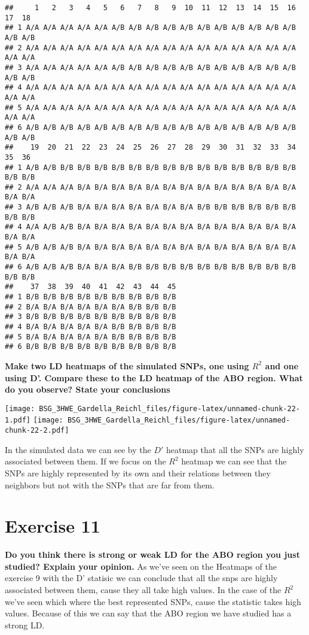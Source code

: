 \documentclass[]{article}
\begin{document}
\begin{verbatim}
##     1   2   3   4   5   6   7   8   9  10  11  12  13  14  15  16  17  18
## 1 A/A A/A A/A A/A A/A A/B A/B A/B A/B A/B A/B A/B A/B A/B A/B A/B A/B A/B
## 2 A/A A/A A/A A/A A/A A/A A/A A/A A/A A/A A/A A/A A/A A/A A/A A/A A/A A/A
## 3 A/A A/A A/A A/A A/A A/B A/B A/B A/B A/B A/B A/B A/B A/B A/B A/B A/B A/B
## 4 A/A A/A A/A A/A A/A A/A A/A A/A A/A A/A A/A A/A A/A A/A A/A A/A A/A A/A
## 5 A/A A/A A/A A/A A/A A/A A/A A/A A/A A/A A/A A/A A/A A/A A/A A/A A/A A/A
## 6 A/B A/B A/B A/B A/B A/B A/B A/B A/B A/B A/B A/B A/B A/B A/B A/B A/B A/B
##    19  20  21  22  23  24  25  26  27  28  29  30  31  32  33  34  35  36
## 1 A/B A/B B/B B/B B/B B/B B/B B/B B/B B/B B/B B/B B/B B/B B/B B/B B/B B/B
## 2 A/A A/A A/A B/A B/A B/A B/A B/A B/A B/A B/A B/A B/A B/A B/A B/A B/A B/A
## 3 A/B A/B A/B B/A B/A B/A B/A B/A B/A B/A B/B B/B B/B B/B B/B B/B B/B B/B
## 4 A/A A/B A/B B/A B/A B/A B/A B/A B/A B/A B/A B/A B/A B/A B/A B/A B/A B/A
## 5 A/B A/B A/B B/A B/A B/A B/A B/A B/A B/A B/A B/A B/A B/A B/A B/A B/A B/A
## 6 A/B A/B A/B B/A B/A B/A B/B B/B B/B B/B B/B B/B B/B B/B B/B B/B B/B B/B
##    37  38  39  40  41  42  43  44  45
## 1 B/B B/B B/B B/B B/B B/B B/B B/B B/B
## 2 B/A B/A B/A B/A B/A B/A B/B B/B B/B
## 3 B/B B/B B/B B/B B/B B/B B/B B/B B/B
## 4 B/A B/A B/A B/A B/A B/B B/B B/B B/B
## 5 B/A B/A B/A B/A B/A B/B B/B B/B B/B
## 6 B/B B/B B/B B/B B/B B/B B/B B/B B/B
\end{verbatim}

\textbf{Make two LD heatmaps of the simulated SNPs, one using \(R^2\)
and one using D'. Compare these to the LD heatmap of the ABO region.
What do you observe? State your conclusions}

\texttt{[image: BSG\_3HWE\_Gardella\_Reichl\_files/figure-latex/unnamed-chunk-22-1.pdf]}
\texttt{[image: BSG\_3HWE\_Gardella\_Reichl\_files/figure-latex/unnamed-chunk-22-2.pdf]}

In the simulated data we can see by the \(D'\) heatmap that all the SNPs
are highly associated between them. If we focus on the \(R^2\) heatmap
we can see that the SNPs are highly represented by its own and their
relations between they neighbors but not with the SNPs that are far from
them.

\section{Exercise 11}\label{exercise-11}

\textbf{Do you think there is strong or weak LD for the ABO region you
just studied? Explain your opinion.} As we've seen on the Heatmaps of
the exercise 9 with the D' statisic we can conclude that all the snps
are highly associated between them, cause they all take high values. In
the case of the \(R^2\) we've seen which where the best represented
SNPs, cause the statistic takes high values. Because of this we can say
that the ABO region we have studied has a strong LD.
\end{document}
